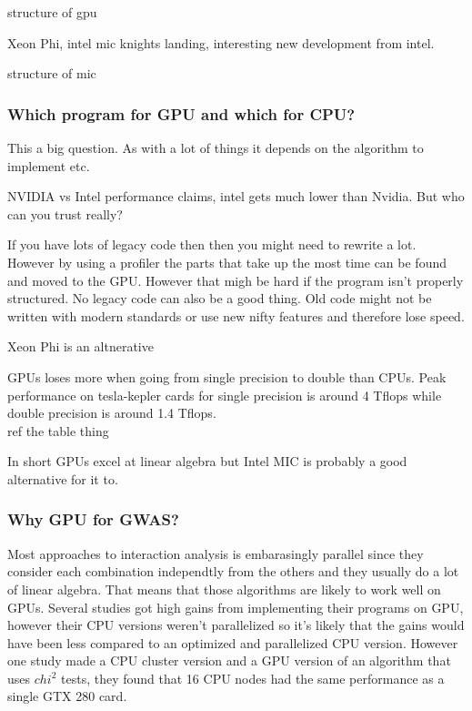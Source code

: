 \documentclass[10pt,a4paper]{article}
\begin{document}
structure of gpu

Xeon Phi, intel mic
knights landing, interesting new development from intel.

structure of mic

\subsubsection{Which program for GPU and which for CPU?}
This a big question. As with a lot of things it depends on the algorithm to implement etc.

NVIDIA vs Intel performance claims, intel gets much lower than Nvidia. But who can you trust really?

If you have lots of legacy code then then you might need to rewrite a lot. However by using a profiler the parts that take up the most time can be found and moved to the GPU. However that migh be hard if the program isn't properly structured. No legacy code can also be a good thing. Old code might not be written with modern standards or use new nifty features and therefore lose speed.

Xeon Phi is an altnerative

GPUs loses more when going from single precision to double than CPUs. Peak performance on tesla-kepler cards for single precision is around 4 Tflops while double precision is around 1.4 Tflops. \cite{nvtesla}\\ ref the table thing

In short GPUs excel at linear algebra but Intel MIC is probably a good alternative for it to.

\subsubsection{Why GPU for GWAS?}
Most approaches to interaction analysis is embarasingly parallel since they consider each combination independtly from the others and they usually do a lot of linear algebra. That means that those algorithms are likely to work well on GPUs. Several studies got high gains from implementing their programs on GPU, however their CPU versions weren't parallelized so it's likely that the gains would have been less compared to an optimized and parallelized CPU version.\cite{gwis,gboost,gmdr_gpu,cuda_lr,genie_2012,plink_gpu} However one study made a CPU cluster version and a GPU version of an algorithm that uses $chi^2$ tests, they found that 16 CPU nodes had the same performance as a single GTX 280 card\cite{jiang_accelerating}.%
\end{document}
